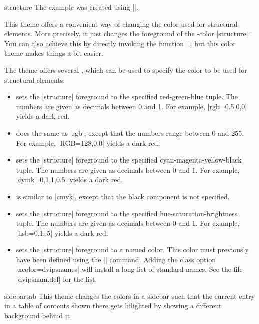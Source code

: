 \begin{colorthemeexample}{structure}
  The example was created using ||. 
  
  This theme offers a convenient way of changing the color used for
  structural elements. More precisely, it just changes the foreground
  of the \beamer-color |structure|. You can also achieve this by
  directly invoking the function |\setbeamercolor|, but this color
  theme makes things a bit easier.

  The theme offers several , which can be used to
  specify the color to be used for structural elements:
  \begin{itemize}
  \item
     sets the |structure| foreground
    to the specified red-green-blue tuple. The numbers are given as
    decimals between 0 and 1. For example, |rgb={0.5,0,0}| yields a
    dark red.
  \item
     does the same as |rgb|, except
    that the numbers range between 0 and 255. For example,
    |RGB={128,0,0}|  yields a dark red.
  \item
     sets the |structure| foreground
    to the specified cyan-magenta-yellow-black tuple. The numbers are
    given as decimals between 0 and 1. For example, |cymk={0,1,1,0.5}|
    yields a dark red.
  \item
     is similar to |cmyk|, except that
    the black component is not specified.
  \item
      sets the |structure| foreground
    to the specified hue-saturation-brightness tuple. The numbers are
    given as decimals between 0 and 1. For example, |hsb={0,1,.5}|
    yields a dark red.
  \item
     sets the |structure| foreground
    to a named color. This color must previously have been defined
    using the |\DefineNamedColor| command. Adding the class option
    |xcolor=dvipsnames| will install a long list of standard
    names. See the file |dvipsnam.def| for the list.
  \end{itemize}
\end{colorthemeexample}

\begin{colorthemeexample}{sidebartab}
  This theme changes the colors in a sidebar such that the current
  entry in a table of contents shown there gets hilighted by showing a
  different background behind it.
\end{colorthemeexample}



